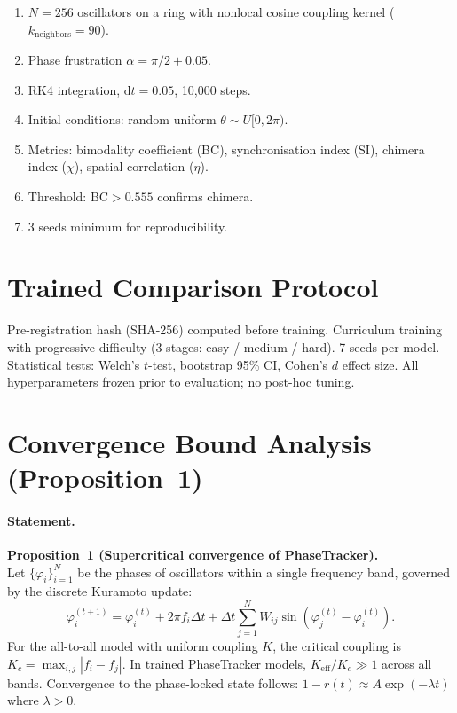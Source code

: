 \documentclass[11pt]{article}
\providecommand{\bc}{\text{BC}}
\begin{document}
\begin{enumerate}
  \item $N = 256$ oscillators on a ring with nonlocal cosine coupling
        kernel ($k_\text{neighbors} = 90$).
  \item Phase frustration $\alpha = \pi/2 + 0.05$.
  \item RK4 integration, $\mathrm{d}t = 0.05$, 10{,}000 steps.
  \item Initial conditions: random uniform $\theta \sim U[0, 2\pi)$.
  \item Metrics: bimodality coefficient (BC), synchronisation index
        (SI), chimera index ($\chi$), spatial correlation ($\eta$).
  \item Threshold: $\bc > 0.555$ confirms chimera.
  \item 3 seeds minimum for reproducibility.
\end{enumerate}

\section{Trained Comparison Protocol}
\label{app:trained_protocol}

Pre-registration hash (SHA-256) computed before training.  Curriculum
training with progressive difficulty (3 stages: easy / medium / hard).
7 seeds per model.  Statistical tests: Welch's $t$-test, bootstrap
95\% CI, Cohen's $d$ effect size.  All hyperparameters frozen prior
to evaluation; no post-hoc tuning.

\section{Convergence Bound Analysis (Proposition~1)}
\label{app:convergence_bound}

\paragraph{Statement.}
\textbf{Proposition~1 (Supercritical convergence of PhaseTracker).}\\
Let $\{\varphi_i\}_{i=1}^{N}$ be the phases of oscillators within a single
frequency band, governed by the discrete Kuramoto update:
\begin{equation}
  \varphi_i^{(t+1)} = \varphi_i^{(t)} + 2\pi f_i \Delta t
    + \Delta t \sum_{j=1}^{N} W_{ij} \sin(\varphi_j^{(t)} - \varphi_i^{(t)}).
\end{equation}
For the all-to-all model with uniform coupling $K$, the critical
coupling is $K_c = \max_{i,j} |f_i - f_j|$. In trained PhaseTracker
models, $K_{\mathrm{eff}} / K_c \gg 1$ across all bands. Convergence
to the phase-locked state follows:
$1 - r(t) \approx A \exp(-\lambda t)$
where $\lambda > 0$.
\end{document}
